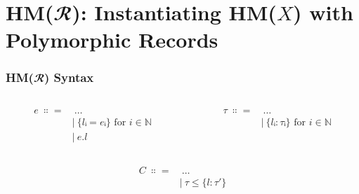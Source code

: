 \documentclass[aspectratio=169]{beamer}
\begin{document}
\section{HM($𝓡$): Instantiating HM($X$) with Polymorphic Records}

\begingroup
\Large
\begin{frame}[fragile]
  \frametitle{HM($𝓡$) Syntax}
  \begin{columns}
    \begin{column}{0.45\textwidth}
      \begin{center}
        \begin{align*}
          e \ ∷= & \ \dots                            \\
                 & | \ \{lᵢ = eᵢ\} \text{ for } i ∈ ℕ \\
                 & | \ e.l
        \end{align*}
      \end{center}
    \end{column}
    \begin{column}{0.45\textwidth}
      \begin{center}
        \begin{align*}
          τ \ ∷= & \ \dots                            \\
                 & | \ \{lᵢ : τᵢ\} \text{ for } i ∈ ℕ
        \end{align*}
      \end{center}
    \end{column}
  \end{columns}
  \begin{center}
    \begin{align*}
      C \ ∷= & \ \dots            \\
             & | \ τ ≤ \{l : τ′\}
    \end{align*}
  \end{center}
\end{frame}
\end{document}
